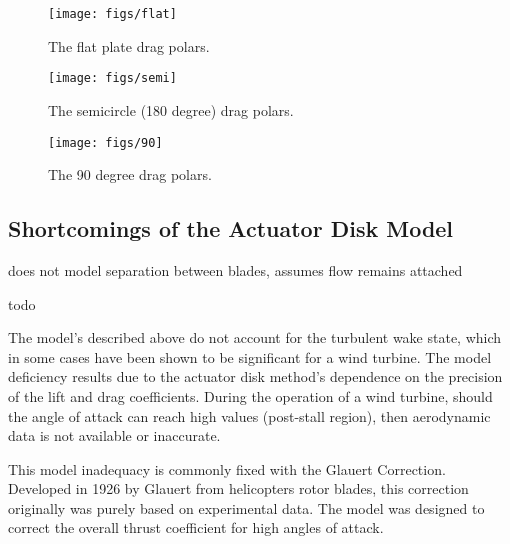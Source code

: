 
\begin{figure}[!htb]
  \begin{center}
    \texttt{[image: figs/flat]}
    \caption{The flat plate drag polars.} 
    \label{fig:flat_plate_drag}
  \end{center}
\end{figure}

\begin{figure}[!htb]
  \begin{center}
    \texttt{[image: figs/semi]}
    \caption{The semicircle (180 degree) drag polars.} 
    \label{fig:semi_drag}
  \end{center}
\end{figure}

\begin{figure}[!htb]
  \begin{center}
    \texttt{[image: figs/90]}
    \caption{The 90 degree drag polars.} 
    \label{fig:90_drag}
  \end{center}
\end{figure}


\subsection{Shortcomings of the Actuator Disk Model}
\label{subsec:wake_loss_model}

does not model separation between blades, assumes flow remains attached

todo

The model's described above do not account for the turbulent wake state,
which in some cases have been shown to be significant for a wind
turbine. The model deficiency results due to the actuator disk
method's dependence on the precision of the lift and drag
coefficients. During the operation of a wind turbine, should the angle
of attack can reach high values (post-stall region), then aerodynamic 
data is not available or inaccurate. 
   
This model inadequacy is commonly fixed with the Glauert Correction. 
Developed in 1926 by Glauert from helicopters rotor blades, this
correction originally was purely based on experimental data. The model
was designed to correct the overall thrust coefficient for high angles
of attack. 

